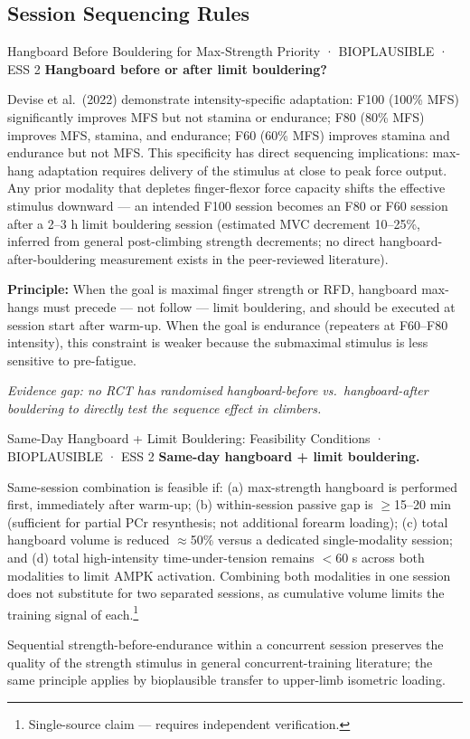 \subsection{Session Sequencing Rules}
\label{subsec:sequencing}

\begin{bioplausbox}{Hangboard Before Bouldering for Max-Strength Priority · BIOPLAUSIBLE · ESS 2}
\textbf{Hangboard before or after limit bouldering?}

Devise et al.\ (2022) demonstrate intensity-specific adaptation: F100 (100\% MFS) significantly improves MFS but not stamina or endurance; F80 (80\% MFS) improves MFS, stamina, and endurance; F60 (60\% MFS) improves stamina and endurance but not MFS. This specificity has direct sequencing implications: max-hang adaptation requires delivery of the stimulus at close to peak force output. Any prior modality that depletes finger-flexor force capacity shifts the effective stimulus downward — an intended F100 session becomes an F80 or F60 session after a 2–3 h limit bouldering session (estimated MVC decrement 10–25\%, inferred from general post-climbing strength decrements; no direct hangboard-after-bouldering measurement exists in the peer-reviewed literature).

\textbf{Principle:} When the goal is maximal finger strength or RFD, hangboard max-hangs must precede — not follow — limit bouldering, and should be executed at session start after warm-up. When the goal is endurance (repeaters at F60–F80 intensity), this constraint is weaker because the submaximal stimulus is less sensitive to pre-fatigue.

\textit{Evidence gap: no RCT has randomised hangboard-before vs.\ hangboard-after bouldering to directly test the sequence effect in climbers.}
\end{bioplausbox}

\begin{bioplausbox}{Same-Day Hangboard + Limit Bouldering: Feasibility Conditions · BIOPLAUSIBLE · ESS 2}
\textbf{Same-day hangboard + limit bouldering.}

Same-session combination is feasible if: (a) max-strength hangboard is performed first, immediately after warm-up; (b) within-session passive gap is $\geq$15–20 min (sufficient for partial PCr resynthesis; not additional forearm loading); (c) total hangboard volume is reduced $\approx$50\% versus a dedicated single-modality session; and (d) total high-intensity time-under-tension remains $<$60 s across both modalities to limit AMPK activation. Combining both modalities in one session does not substitute for two separated sessions, as cumulative volume limits the training signal of each.\footnote{Single-source claim — requires independent verification.}

Sequential strength-before-endurance within a concurrent session preserves the quality of the strength stimulus in general concurrent-training literature; the same principle applies by bioplausible transfer to upper-limb isometric loading.
\end{bioplausbox}

